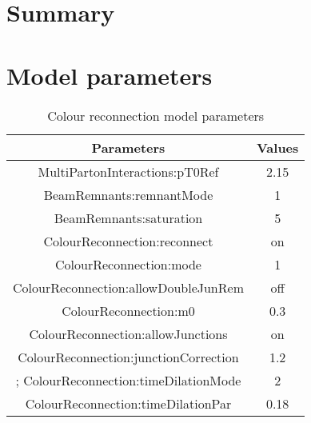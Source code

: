 \documentclass[ALICE,manyauthors]{StrinJet}
\begin{document}
\clearpage
\section{Summary}
\label{sec:sum}


\newenvironment{acknowledgement}{\relax}{\relax}
%





\clearpage
\appendix
\section{Model parameters}
\label{app:modpara}

\begin{table}[ht]
\label{tab:CRparameter}
  \begin{center}
  \begin{tabular}{|c|c|}
	\hline
	  Parameters & Values \\
	\hline 
	MultiPartonInteractions:pT0Ref &  2.15\\ 
	BeamRemnants:remnantMode & 1 \\
	BeamRemnants:saturation & 5 \\
	ColourReconnection:reconnect & on \\
	ColourReconnection:mode & 1 \\
	ColourReconnection:allowDoubleJunRem & off \\
	ColourReconnection:m0 & 0.3  \\
	ColourReconnection:allowJunctions & on \\
	ColourReconnection:junctionCorrection & 1.2 \\;
	ColourReconnection:timeDilationMode & 2 \\
	ColourReconnection:timeDilationPar & 0.18\\ 
	\hline 
  \end{tabular} 
  \caption{Colour reconnection model parameters}
  \end{center}
\end{table}
\end{document}
